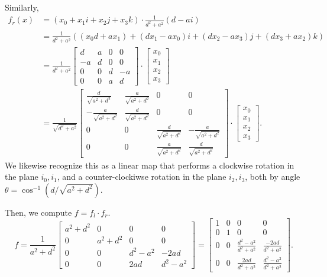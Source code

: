 \documentclass[11pt]{article}
\begin{document}
\begin{enumerate}
        Similarly,
        \begin{align*}
            f_r (x) &= (x_0 + x_1i + x_2 j + x_3k) \cdot \frac{1}{d^2 + a^2} (d - ai) \\
            &= \frac{1}{d^2 + a^2} ((x_0 d + a x_1) + (d x_1 - a x_0) i + (d x_2 - ax_3)j + (d x_3 + a x_2)k) \\
            &= \frac{1}{d^2 + a^2} \begin{bmatrix} d & a & 0 & 0 \\ -a & d & 0 & 0 \\ 0 & 0 & d & -a\\ 0 & 0 & a & d \end{bmatrix} \cdot \begin{bmatrix} x_0 \\ x_1 \\ x_2 \\ x_3 \end{bmatrix} \\
            &= \frac{1}{\sqrt{d^2 + a^2}} \begin{bmatrix} \frac{d}{\sqrt{a^2 + d^2}} & \frac{a}{\sqrt{a^2 + d^2}} & 0 & 0 \\ -\frac{a}{\sqrt{a^2 + d^2}} & \frac{d}{\sqrt{a^2 + d^2}} & 0 & 0 \\ 0 & 0 & \frac{d}{\sqrt{a^2 + d^2}} & -\frac{a}{\sqrt{a^2 + d^2}}\\ 0 & 0 & \frac{a}{\sqrt{a^2 + d^2}} & \frac{d}{\sqrt{a^2 + d^2}} \end{bmatrix} \cdot \begin{bmatrix} x_0 \\ x_1 \\ x_2 \\ x_3 \end{bmatrix} 
        .\end{align*}
        We likewise recognize this as a linear map that performs a clockwise rotation in the plane $i_0, i_1$, and a counter-clockiwse rotation in the plane $i_2, i_3$, both by angle $\theta = \cos^{-1} (d / \sqrt{a^2 + d^2})$.

        Then, we compute $f = f_l \cdot f_r$.
        \[
            f = \frac{1}{a^2 + d^2} \begin{bmatrix} a^2 + d^2 & 0 & 0 & 0 \\ 0 & a^2 + d^2 & 0 & 0 \\ 0 & 0 & d^2 - a^2 & -2ad \\ 0 & 0 & 2ad & d^2 - a^2 \end{bmatrix}  = \begin{bmatrix} 1 & 0 & 0 & 0 \\ 0 & 1 & 0 & 0 \\ 0 & 0 & \frac{d^2 - a^2}{d^2 + a^2} & \frac{-2ad}{d^2 + a^2} \\ 0 & 0 & \frac{2ad}{d^2 + a^2} & \frac{d^2 - a^2}{d^2 + a^2} \end{bmatrix} 
        .\]


\end{enumerate}
\end{document}
